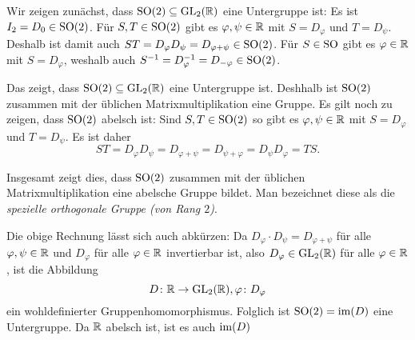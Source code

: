 Wir zeigen zunächst, dass $\mathrm{SO}(2) \subseteq \mathrm{GL}_2(\mathbb{R})$ eine Untergruppe ist: Es ist \mbox{$I_2 = D_0 \in \mathrm{SO}(2)$}. Für $S, T \in \mathrm{SO}(2)$ gibt es $\varphi, \psi \in \mathbb{R}$ mit $S = D_{\varphi}$ und $T = D_{\psi}$. Deshalb ist damit auch $S T = D_{\varphi} D_{\psi} = D_{\varphi+\psi} \in \mathrm{SO}(2)$. Für $S \in \mathrm{SO}$ gibt es $\varphi \in \mathbb{R}$ mit $S = D_{\varphi}$, weshalb auch $S^{-1} = D_{\varphi}^{-1} = D_{-\varphi} \in \mathrm{SO}(2)$.

Das zeigt, dass $\mathrm{SO}(2) \subseteq \mathrm{GL}_2(\mathbb{R})$ eine Untergruppe ist. Deshhalb ist $\mathrm{SO}(2)$ zusammen mit der üblichen Matrixmultiplikation eine Gruppe. Es gilt noch zu zeigen, dass $\mathrm{SO}(2)$ abelsch ist: Sind $S, T \in \mathrm{SO}(2)$ so gibt es $\varphi, \psi \in \mathbb{R}$ mit $S = D_\varphi$ und $T = D_\psi$. Es ist daher
\[
 S T
 = D_{\varphi} D_{\psi}
 = D_{\varphi+\psi}
 = D_{\psi+\varphi}
 = D_{\psi} D_{\varphi}
 = T S.
\]

Insgesamt zeigt dies, dass $\mathrm{SO}(2)$ zusammen mit der üblichen Matrixmultiplikation eine abelsche Gruppe bildet. Man bezeichnet diese als die \emph{spezielle orthogonale Gruppe (von Rang $2$)}.

\begin{bem}
 Die obige Rechnung lässt sich auch abkürzen: Da $D_{\varphi} \cdot D_{\psi} = D_{\varphi + \psi}$ für alle $\varphi, \psi \in \mathbb{R}$ und $D_{\varphi}$ für alle $\varphi \in \mathbb{R}$ invertierbar ist, also $D_{\varphi} \in \mathrm{GL}_2(\mathbb{R})$ für alle $\varphi \in \mathbb{R}$, ist die Abbildung
 \[
  D \colon \mathbb{R} \to \mathrm{GL}_2(\mathbb{R}), \varphi \colon D_{\varphi}
 \]
 ein wohldefinierter Gruppenhomomorphismus. Folglich ist $\mathrm{SO}(2) = \mathrm{im}(D)$ eine Untergruppe. Da $\mathbb{R}$ abelsch ist, ist es auch $\mathrm{im}(D)$
\end{bem}


